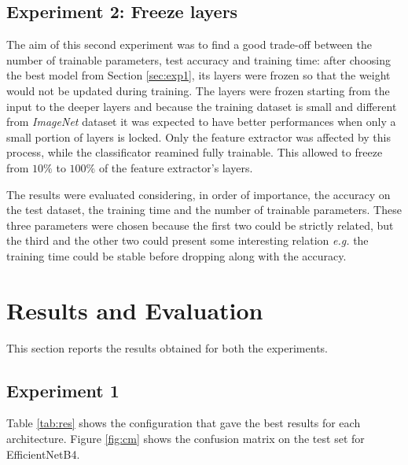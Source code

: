 \subsection{Experiment 2: Freeze layers}\label{sec:exp2}
The aim of this second experiment was to find a good trade-off between the number of trainable parameters, test accuracy and training time: after choosing the best model from Section \ref{sec:exp1}, its layers were frozen so that the weight would not be updated during training. The layers were frozen starting from the input to the deeper layers and because the training dataset is small and different from \textit{ImageNet} dataset it was expected to have better performances when only a small portion of layers is locked. Only the feature extractor was affected by this process, while the classificator reamined fully trainable. This allowed to freeze from $10\%$ to $100\%$ of the feature extractor's layers.\par
The results were evaluated considering, in order of importance,  the accuracy on the test dataset, the training time and the number of trainable parameters. These three parameters were chosen because the first two could be strictly related, but the third and the other two could present some interesting relation \textit{e.g.} the training time could be stable before dropping along with the accuracy.





\section{Results and Evaluation}
This section reports the results obtained for both the experiments. 


\subsection{Experiment 1}

Table \ref{tab:res} shows the configuration that gave the best results for
 each architecture. Figure \ref{fig:cm} shows the confusion matrix on the test set for EfficientNetB4.

\begin{table}[ht!]
\centering
\caption{}
\label{tab:res}
\end{table}

